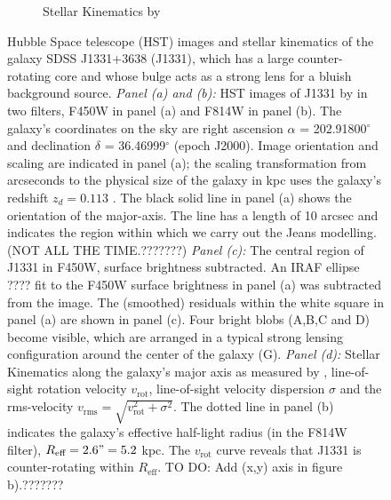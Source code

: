 \begin{figure}
\begin{subfigure}{.5\textwidth}
  \caption{Stellar Kinematics by \citet{SWELLSV}}
  \label{fig:???}
\end{subfigure}
\caption{Hubble Space telescope (HST) images and stellar kinematics of the galaxy SDSS J1331+3638 (J1331), which has a large counter-rotating core and whose bulge acts as a strong lens for a bluish background source. \emph{Panel (a) and (b):} HST images of J1331 by \citet{SWELLSI} in two filters, F450W in panel (a) and F814W in panel (b). The galaxy's coordinates on the sky are right ascension $\alpha$ = 202.91800$^\circ$ and declination $\delta$ = 36.46999$^\circ$ (epoch J2000). Image orientation and scaling are indicated in panel (a); the scaling transformation from arcseconds to the physical size of the galaxy in kpc uses the galaxy's redshift $z_d = 0.113$ \citep{SWELLSIII}. The black solid line in panel (a) shows the orientation of the major-axis. The line has a length of 10 arcsec and indicates the region within which we carry out the Jeans modelling. (NOT ALL THE TIME.???????) \emph{Panel (c):} The central region of J1331 in F450W, surface brightness subtracted. An IRAF ellipse ???? fit to the F450W surface brightness in panel (a) was subtracted from the image. The (smoothed) residuals within the white square in panel (a) are shown in panel (c). Four bright blobs (A,B,C and D) become visible, which are arranged in a typical strong lensing configuration around the center of the galaxy (G). \emph{Panel (d):} Stellar Kinematics along the galaxy's major axis as measured by \citet{SWELLSV}, line-of-sight rotation velocity $v_\text{rot}$, line-of-sight velocity dispersion $\sigma$ and the rms-velocity $v_\text{rms} = \sqrt{v_\text{rot}^2 + \sigma^2}$. The dotted line in panel (b) indicates the galaxy's effective half-light radius (in the F814W filter), $R_\text{eff} = 2.6" = 5.2$ kpc. The $v_\text{rot}$ curve reveals that J1331 is counter-rotating within $R_\text{eff}$. TO DO: Add (x,y) axis in figure b).???????}
\label{fig:specialJ1331}
\end{figure}

\clearpage
